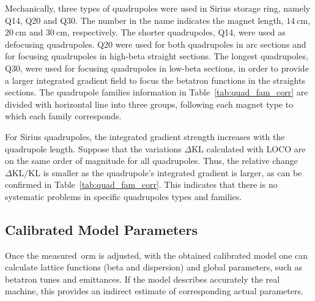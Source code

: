 Mechanically, three types of quadrupoles were used in Sirius storage ring, namely Q14, Q20 and Q30. The number in the name indicates the magnet length, $\SI{14}{\cm}$, $\SI{20}{\cm}$ and $\SI{30}{\cm}$, respectively. The shorter quadrupoles, Q14, were used as defocusing quadrupoles. Q20 were used for both quadrupoles in arc sections and for focusing quadrupoles in high-beta straight sections. The longest quadrupoles, Q30, were used for focusing quadrupoles in low-beta sections, in order to provide a larger integrated gradient field to focus the betatron functions in the straights sections. The quadrupole families information in Table~\ref{tab:quad_fam_corr} are divided with horizontal line into three groups, following each magnet type to which each family corresponds. 

For Sirius quadrupoles, the integrated gradient strength increases with the quadrupole length. Suppose that the variations $\Delta \mathrm{KL}$ calculated with LOCO are on the same order of magnitude for all quadrupoles. Thus, the relative change $\Delta \mathrm{KL}/ \mathrm{KL}$ is smaller as the quadrupole's integrated gradient is larger, as can be confirmed in Table~\ref{tab:quad_fam_corr}. This indicates that there is no systematic problems in specific quadrupoles types and families. 

\subsection{Calibrated Model Parameters}
Once the measured~\gls{orm} is adjusted, with the obtained calibrated model one can calculate lattice functions (beta and dispersion) and global parameters, such as betatron tunes and emittances. If the model describes accurately the real machine, this provides an indirect estimate of corresponding actual parameters.

